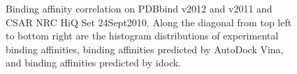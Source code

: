 \documentclass[12pt]{article}
\begin{document}
\clearpage

\begin{center}
\begin{figure}
\caption{\label{FECorrelation} Binding affinity correlation on PDBbind v2012 and v2011 and CSAR NRC HiQ Set 24Sept2010. Along the diagonal from top left to bottom right are the histogram distributions of experimental binding affinities, binding affinities predicted by AutoDock Vina, and binding affinities predicted by idock.}
\end{figure}
\end{center}

\clearpage
\end{document}
